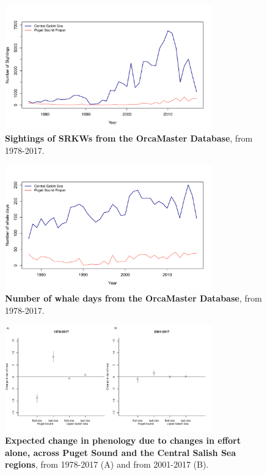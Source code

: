 \documentclass{article}
\begin{document}
\begin{figure}[p]
\includegraphics[width=0.8\textwidth]{../analyses/figures/OrcaPhenPlots/numsights_1976_2regs.pdf} 
\caption{\textbf{Sightings of SRKWs from the OrcaMaster Database}, from 1978-2017. }
\label{fig:sights}
\end{figure}

\begin{figure}[p]
\includegraphics[width=0.8\textwidth]{../analyses/figures/OrcaPhenPlots/whaledays_assumeSRKW2regs.pdf} 
\caption{\textbf{Number of whale days from the OrcaMaster Database}, from 1978-2017. }
\label{fig:wdays}
\end{figure}


\begin{figure}[p]
\includegraphics[width=0.8\textwidth]{../analyses/orcaphen/figures/simeffortonly2panels.png} 
\caption{\textbf{Expected change in phenology due to changes in effort alone, across Puget Sound and the Central Salish Sea regions}, from 1978-2017 (A) and from 2001-2017 (B). }
\label{fig:simeffort}
\end{figure}
\end{document}
